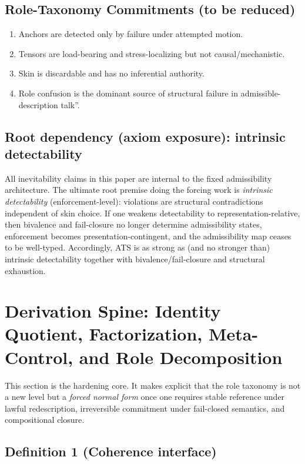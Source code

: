\documentclass[12pt]{article}
\theoremstyle{plain}
\begin{document}
\subsection{Role-Taxonomy Commitments (to be reduced)}

\begin{enumerate}[leftmargin=*]
\item Anchors are detected only by failure under attempted motion.
\item Tensors are load-bearing and stress-localizing but not causal/mechanistic.
\item Skin is discardable and has no inferential authority.
\item Role confusion is the dominant source of structural failure in admissible-description talk''.
\end{enumerate}

\subsection{Root dependency (axiom exposure): intrinsic detectability}

All inevitability claims in this paper are internal to the fixed admissibility architecture. The ultimate root premise doing the forcing work is \emph{intrinsic detectability} (enforcement-level): violations are structural contradictions independent of skin choice. If one weakens detectability to representation-relative, then bivalence and fail-closure no longer determine admissibility states, enforcement becomes presentation-contingent, and the admissibility map ceases to be well-typed. Accordingly, ATS is as strong as (and no stronger than) intrinsic detectability together with bivalence/fail-closure and structural exhaustion.

\section{Derivation Spine: Identity Quotient, Factorization, Meta-Control, and Role Decomposition}

This section is the hardening core. It makes explicit that the role taxonomy is not a new level but a \emph{forced normal form} once one requires stable reference under lawful redescription, irreversible commitment under fail-closed semantics, and compositional closure.

\subsection{Definition 1 (Coherence interface)}
\end{document}
